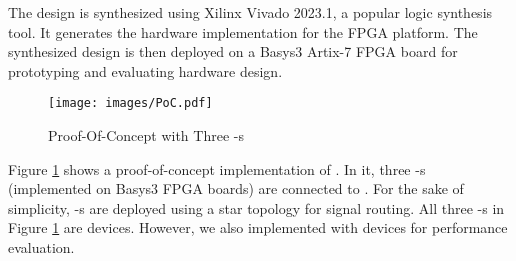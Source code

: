 The design is synthesized using Xilinx Vivado 2023.1, a popular logic synthesis tool. 
It generates the hardware implementation for the FPGA platform. The synthesized design 
is then deployed on a Basys3 Artix-7 FPGA board for prototyping and evaluating hardware design.

\begin{figure}
    \captionsetup{justification = centering}
    \centering
    \texttt{[image: images/PoC.pdf]}
    \caption{\system Proof-Of-Concept with Three \prv-s}  
    \vspace{-1.5em}
    \label{fig: PoC}
\end{figure}

Figure \ref{fig: PoC} shows a proof-of-concept implementation of \system. In it,
three \prv-s (implemented on Basys3 FPGA boards) are connected to \vrf. For the sake of simplicity, 
\prv-s are deployed using a star topology for signal routing. All three \prv-s in Figure \ref{fig: PoC} are \trapscasu 
devices. However, we also implemented \system with \trapsrata devices for performance evaluation.

